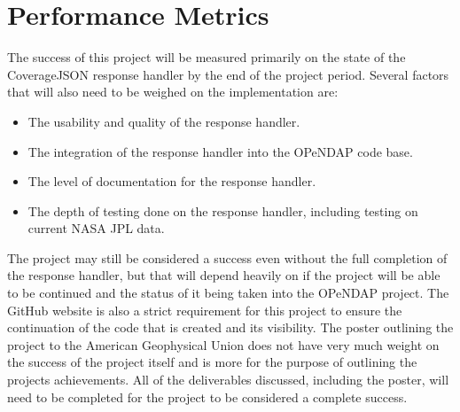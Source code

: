 \documentclass[letterpaper,10pt,draftclsnofoot,onecolumn]{IEEEtran}
\begin{document}
\section{Performance Metrics}
The success of this project will be measured primarily on the state of the CoverageJSON response handler by the end of the project period. Several factors that will also need to be weighed on the implementation are: 
\begin{itemize}
  \item The usability and quality of the response handler.
  \item The integration of the response handler into the OPeNDAP code base.
  \item The level of documentation for the response handler.
  \item The depth of testing done on the response handler, including testing on current NASA JPL data.
\end{itemize} 
The project may still be considered a success even without the full completion of the response handler, but that will depend heavily on if the project will be able to be continued and the status of it being taken into the OPeNDAP project. The GitHub website is also a strict requirement for this project to ensure the continuation of the code that is created and its visibility. The poster outlining the project to the American Geophysical Union does not have very much weight on the success of the project itself and is more for the purpose of outlining the projects achievements. All of the deliverables discussed, including the poster, will need to be completed for the project to be considered a complete success.
\end{document}
